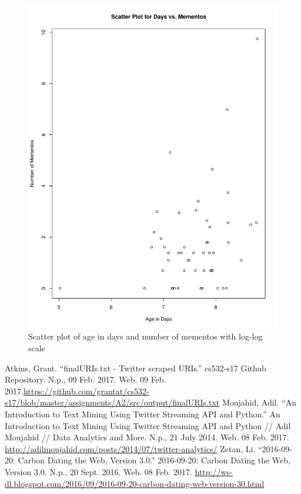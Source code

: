 \documentclass[letterpaper,11pt]{article}
\begin{document}
\begin{figure}[h]
\centering
\includegraphics[scale=0.6]{carbonDateScatterplot2.pdf}
\caption{Scatter plot of age in days and number of mementos with log-log scale}
\label{fig:scatterplot2}
\end{figure}

\clearpage


\begin{thebibliography}{9}
Atkins, Grant. ``finalURIs.txt - Twitter scraped URIs.'' cs532-s17 Github Repository. N.p., 09 Feb. 2017. Web. 09 Feb. 2017.\url{https://github.com/grantat/cs532-s17/blob/master/assignments/A2/src/output/finalURIs.txt}
Moujahid, Adil. ``An Introduction to Text Mining Using Twitter Streaming API and Python.'' An Introduction to Text Mining Using Twitter Streaming API and Python // Adil Moujahid // Data Analytics and More. N.p., 21 July 2014. Web. 08 Feb. 2017. \url{http://adilmoujahid.com/posts/2014/07/twitter-analytics/}
Zetan, Li. ``2016-09-20: Carbon Dating the Web, Version 3.0.'' 2016-09-20: Carbon Dating the Web, Version 3.0. N.p., 20 Sept. 2016. Web. 08 Feb. 2017. \url{http://ws-dl.blogspot.com/2016/09/2016-09-20-carbon-dating-web-version-30.html}
\end{thebibliography}
\end{document}
